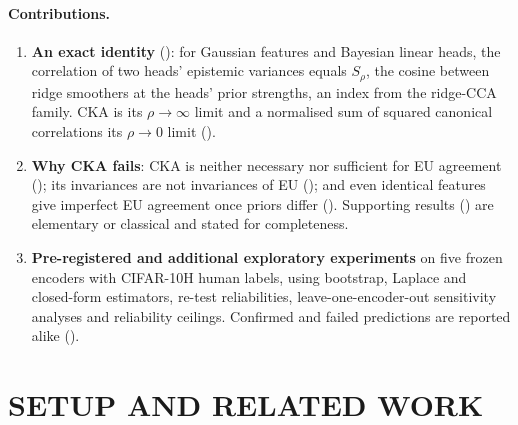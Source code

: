 \documentclass[twoside]{article}
\theoremstyle{definition}
\theoremstyle{remark}
\newcommand{\Srho}{S_{\rho}}
\begin{document}
\paragraph{Contributions.}
\begin{enumerate}[leftmargin=*,itemsep=1pt,topsep=1pt]
\item \textbf{An exact identity} (): for Gaussian features and Bayesian linear heads, the correlation of two heads' epistemic variances equals $\Srho$, the cosine between ridge smoothers at the heads' prior strengths, an index from the ridge-CCA family. CKA is its $\rho\to\infty$ limit and a normalised sum of squared canonical correlations its $\rho\to0$ limit ().
\item \textbf{Why CKA fails}: CKA is neither necessary nor sufficient for EU agreement (); its invariances are not invariances of EU (); and even identical features give imperfect EU agreement once priors differ (). Supporting results () are elementary or classical and stated for completeness.
\item \textbf{Pre-registered and additional exploratory experiments} on five frozen encoders with CIFAR-10H human labels, using bootstrap, Laplace and closed-form estimators, re-test reliabilities, leave-one-encoder-out sensitivity analyses and reliability ceilings. Confirmed and failed predictions are reported alike ().
\end{enumerate}

\section{SETUP AND RELATED WORK}
\label{sec:setup}
\end{document}
